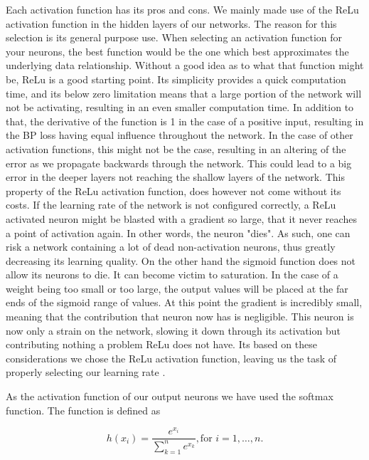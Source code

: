 Each activation function has its pros and cons. We mainly made use of the
\gls{ReLu} activation function in the hidden layers of our networks. The reason
for this selection is its general purpose use. When selecting an activation
function for your neurons, the best function would be the one which best
approximates the underlying data relationship. Without a good idea as to what
that function might be, \gls{ReLu} is a good starting point. Its simplicity
provides a quick computation time, and its below zero limitation means that
a large portion of the network will not be activating, resulting in an even
smaller computation time. In addition to that, the derivative of the function
is 1 in the case of a positive input, resulting in the \gls{BP} loss having
equal influence throughout the network. In the case of other activation
functions, this might not be the case, resulting in an altering of the error
as we propagate backwards through the network. This could lead to a big error
in the deeper layers not reaching the shallow layers of the network. This
property of the \gls{ReLu} activation function, does however not come without
its costs. If the learning rate of the network is not configured correctly, a
\gls{ReLu} activated neuron might be blasted with a gradient so large, that it
never reaches a point of activation again. In other words, the neuron "dies". As
such, one can risk a network containing a lot of dead non-activation neurons,
thus greatly decreasing its learning quality. On the other hand the sigmoid
function does not allow its neurons to die. It can become victim to saturation.
In the case of a weight being too small or too large, the output values will
be placed at the far ends of the sigmoid range of values. At this point the
gradient is incredibly small, meaning that the contribution that neuron now
has is negligible. This neuron is now only a strain on the network, slowing
it down through its activation but contributing nothing a problem \gls{ReLu}
does not have. Its based on these considerations we chose the \gls{ReLu}
activation function, leaving us the task of properly selecting our learning rate
\citep{JiYan, AndrejKarpathy, AvinashSharmaV}.

As the activation function of our output neurons we have used the softmax
function. The function is defined as

\begin{equation}
    h(x_i) = \frac{e^{x_i}}{\sum_{k=1}^n e^{x_k}}, \text{for $i = 1,\dots,n$}.
\end{equation}

